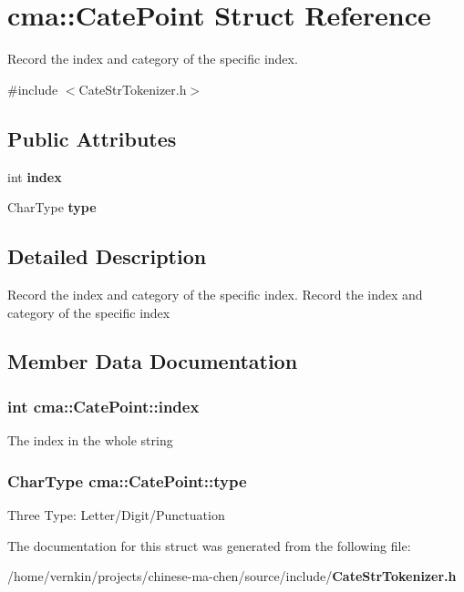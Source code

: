 \section{cma::CatePoint Struct Reference}
\label{structcma_1_1CatePoint}


Record the index and category of the specific index.  


{\ttfamily \#include $<$CateStrTokenizer.h$>$}\subsection*{Public Attributes}
\begin{DoxyCompactItemize}
\item 
int {\bf index}
\item 
CharType {\bf type}
\end{DoxyCompactItemize}


\subsection{Detailed Description}
Record the index and category of the specific index. Record the index and category of the specific index 

\subsection{Member Data Documentation}
\subsubsection[{index}]{\setlength{\rightskip}{0pt plus 5cm}int {\bf cma::CatePoint::index}}\label{structcma_1_1CatePoint_a4d5fb8b0c7028e57ef179c0630f0eee7}
The index in the whole string 
\subsubsection[{type}]{\setlength{\rightskip}{0pt plus 5cm}CharType {\bf cma::CatePoint::type}}\label{structcma_1_1CatePoint_a1eddb8c6760d5cd21d5f15b1ee8eb01f}
Three Type: Letter/Digit/Punctuation 

The documentation for this struct was generated from the following file:\begin{DoxyCompactItemize}
\item 
/home/vernkin/projects/chinese-\/ma-\/chen/source/include/{\bf CateStrTokenizer.h}\end{DoxyCompactItemize}
